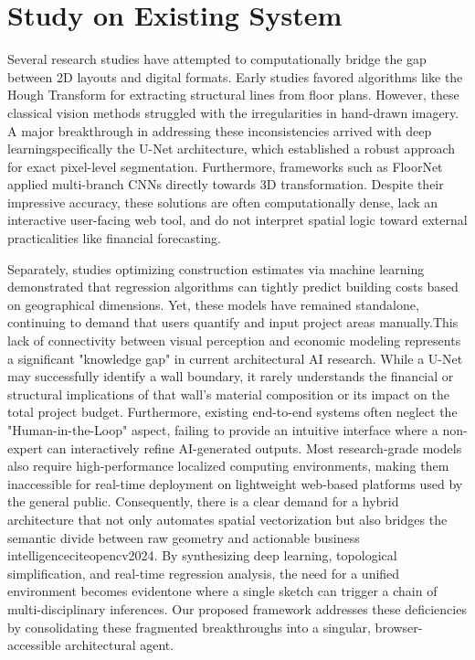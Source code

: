 \documentclass[12pt]{report}
\begin{document}
\section{Study on Existing System}

Several research studies have attempted to computationally bridge the gap between 2D layouts and digital formats. Early studies favored algorithms like the Hough Transform\cite{ahmed2018} for extracting structural lines from floor plans. However, these classical vision methods struggled with the irregularities in hand-drawn imagery.
A major breakthrough in addressing these inconsistencies arrived with deep learningspecifically the U-Net architecture\cite{ronneberger2015}, which established a robust approach for exact pixel-level segmentation. Furthermore, frameworks such as FloorNet\cite{liu2017} applied multi-branch CNNs directly towards 3D transformation. Despite their impressive accuracy, these solutions are often computationally dense, lack an interactive user-facing web tool, and do not interpret spatial logic toward external practicalities like financial forecasting.

Separately, studies optimizing construction estimates via machine learning\cite{wang2020} demonstrated that regression algorithms can tightly predict building costs based on geographical dimensions. Yet, these models have remained standalone, continuing to demand that users quantify and input project areas manually.This lack of connectivity between visual perception and economic modeling represents a significant "knowledge gap" in current architectural AI research. While a U-Net may successfully identify a wall boundary, it rarely understands the financial or structural implications of that wall's material composition or its impact on the total project budget. Furthermore, existing end-to-end systems often neglect the "Human-in-the-Loop" aspect, failing to provide an intuitive interface where a non-expert can interactively refine AI-generated outputs.
Most research-grade models also require high-performance localized computing environments, making them inaccessible for real-time deployment on lightweight web-based platforms used by the general public. Consequently, there is a clear demand for a hybrid architecture that not only automates spatial vectorization but also bridges the semantic divide between raw geometry and actionable business intelligencecite{opencv2024}. By synthesizing deep learning, topological simplification, and real-time regression analysis, the need for a unified environment becomes evident\—one where a single sketch can trigger a chain of multi-disciplinary inferences. Our proposed framework addresses these deficiencies by consolidating these fragmented breakthroughs into a singular, browser-accessible architectural agent.
\end{document}
